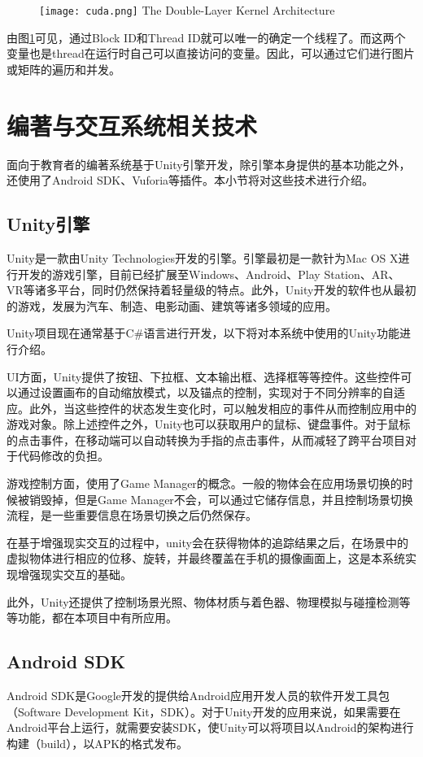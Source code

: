 \begin{figure}[!htp]
  \centering
  \texttt{[image: cuda.png]}
    {The Double-Layer Kernel Architecture }
 \label{fig:ceda}
\end{figure}

由图\ref{fig:ceda}可见，通过Block ID和Thread ID就可以唯一的确定一个线程了。而这两个变量也是thread在运行时自己可以直接访问的变量。因此，可以通过它们进行图片或矩阵的遍历和并发。

\section{编著与交互系统相关技术}
面向于教育者的编著系统基于Unity引擎开发，除引擎本身提供的基本功能之外，还使用了Android SDK、Vuforia等插件。本小节将对这些技术进行介绍。

\subsection{Unity引擎}
Unity\cite{Unity}是一款由Unity Technologies开发的引擎。引擎最初是一款针为Mac OS X进行开发的游戏引擎，目前已经扩展至Windows、Android、Play Station、AR、VR等诸多平台，同时仍然保持着轻量级的特点。此外，Unity开发的软件也从最初的游戏，发展为汽车、制造、电影动画、建筑等诸多领域的应用。

Unity项目现在通常基于C\#语言进行开发，以下将对本系统中使用的Unity功能进行介绍。
	
UI方面，Unity提供了按钮、下拉框、文本输出框、选择框等等控件。这些控件可以通过设置画布的自动缩放模式，以及锚点的控制，实现对于不同分辨率的自适应。此外，当这些控件的状态发生变化时，可以触发相应的事件从而控制应用中的游戏对象。除上述控件之外，Unity也可以获取用户的鼠标、键盘事件。对于鼠标的点击事件，在移动端可以自动转换为手指的点击事件，从而减轻了跨平台项目对于代码修改的负担。

游戏控制方面，使用了Game Manager的概念。一般的物体会在应用场景切换的时候被销毁掉，但是Game Manager不会，可以通过它储存信息，并且控制场景切换流程，是一些重要信息在场景切换之后仍然保存。

在基于增强现实交互的过程中，unity会在获得物体的追踪结果之后，在场景中的虚拟物体进行相应的位移、旋转，并最终覆盖在手机的摄像画面上，这是本系统实现增强现实交互的基础。

此外，Unity还提供了控制场景光照、物体材质与着色器、物理模拟与碰撞检测等等功能，都在本项目中有所应用。

\subsection{Android SDK}
Android SDK\cite{Android}是Google开发的提供给Android应用开发人员的软件开发工具包（Software Development Kit，SDK）。对于Unity开发的应用来说，如果需要在Android平台上运行，就需要安装SDK，使Unity可以将项目以Android的架构进行构建（build），以APK的格式发布。

